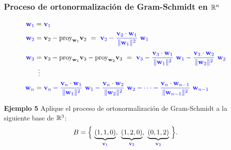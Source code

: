 
\subsection{}

{\nologo
\begin{frame}\frametitle{Proceso de ortonormalización de Gram-Schmidt en $\mathbb{R}^n$}

\begin{prop}{}%
	
	\vspace{-4mm}
	\[
	\begin{array}{r@{\hspace{0.5\tabcolsep}}c@{\hspace{0.5\tabcolsep}}l}
	{\color{blue}\mathbf{w}_1} & = & {\color{blue}\mathbf{v}_1} \\[2mm]
	{\color{blue}\mathbf{w}_2} & = & \mathbf{v}_2 - \text{proy}_{\mathbf{w}_1} \mathbf{v}_2 \ = \ {\color{blue} \mathbf{v}_2 - 
		\dfrac{\mathbf{v}_2\cdot \mathbf{w}_1}{\Vert \mathbf{w}_1 \Vert^2}\ \mathbf{w}_1 } \\[5mm]
	{\color{blue}\mathbf{w}_3} & = & \mathbf{v}_3 - \text{proy}_{\mathbf{w}_1} \mathbf{v}_3 - \text{proy}_{\mathbf{w}_2} \mathbf{v}_3 \ = \ 
	{\color{blue} \mathbf{v}_3 - \dfrac{\mathbf{v}_3\cdot \mathbf{w}_1}{\Vert \mathbf{w}_1 \Vert^2}\ \mathbf{w}_1
		- \dfrac{\mathbf{v}_3\cdot \mathbf{w}_2}{\Vert \mathbf{w}_2 \Vert^2}\ \mathbf{w}_2 } \\[0mm]
	& \vdots & \\[2mm]
	{\color{blue}\mathbf{w}_n} & = & {\color{blue} \mathbf{v}_n - \dfrac{\mathbf{v}_n\cdot \mathbf{w}_1}{\Vert \mathbf{w}_1 \Vert^2}\ \mathbf{w}_1 - \dfrac{\mathbf{v}_n\cdot \mathbf{w}_2}{\Vert \mathbf{w}_2 \Vert^2}\ \mathbf{w}_2 - \cdots
		- \dfrac{\mathbf{v}_n\cdot \mathbf{w}_{n-1}}{\Vert \mathbf{w}_{n-1} \Vert^2}\ \mathbf{w}_{n-1} }
	\end{array}
	\]
\end{prop}	

\begin{ej}{\textbf{Ejemplo 5}}\justifying 
	Aplique el proceso de ortonormalización de Gram-Schmidt a la siguiente base de $\mathbb{R}^3$:
	\[
	B = \Big\{ \, \underbrace{(1,1,0)}_{\color{blue}\mathbf{v}_1}, \ \underbrace{(1,2,0)}_{\color{blue}\mathbf{v}_2}
	           , \ \underbrace{(0,1,2)}_{\color{blue}\mathbf{v}_3} \, \Big\}.
	\]
\end{ej}

\end{frame}
}

